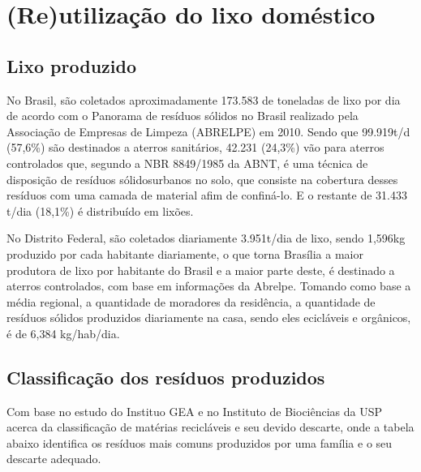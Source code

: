 \section{(Re)utilização do lixo doméstico}

\subsection{Lixo produzido}

No Brasil, são coletados aproximadamente 173.583 de toneladas de lixo por dia de acordo com o Panorama de resíduos sólidos no Brasil realizado pela Associação de Empresas de Limpeza (ABRELPE) em 2010. Sendo que 99.919t/d (57,6\%) são destinados a aterros sanitários, 42.231 (24,3\%) vão para aterros controlados que, segundo a NBR 8849/1985 da ABNT, é uma técnica de disposição de resíduos sólidosurbanos no solo, que consiste na cobertura desses resíduos com uma camada de material afim de confiná-lo. E o restante de 31.433 t/dia (18,1\%) é distribuído em lixões.

No Distrito Federal, são coletados diariamente 3.951t/dia de lixo, sendo 1,596kg produzido por cada habitante diariamente, o que torna Brasília a maior produtora de lixo por habitante do Brasil e a maior parte deste, é destinado a aterros controlados, com base em informações da Abrelpe. Tomando como base a média regional, a quantidade de moradores da residência, a quantidade de resíduos sólidos produzidos diariamente na casa, sendo eles ecicláveis e orgânicos, é de 6,384 kg/hab/dia.

\subsection{Classificação dos resíduos produzidos}

Com base no estudo do Instituo GEA e no Instituto de Biociências da USP acerca da classificação de matérias recicláveis e seu devido descarte, onde a tabela abaixo identifica os resíduos mais comuns produzidos por uma família e o seu descarte adequado.

\newpage


